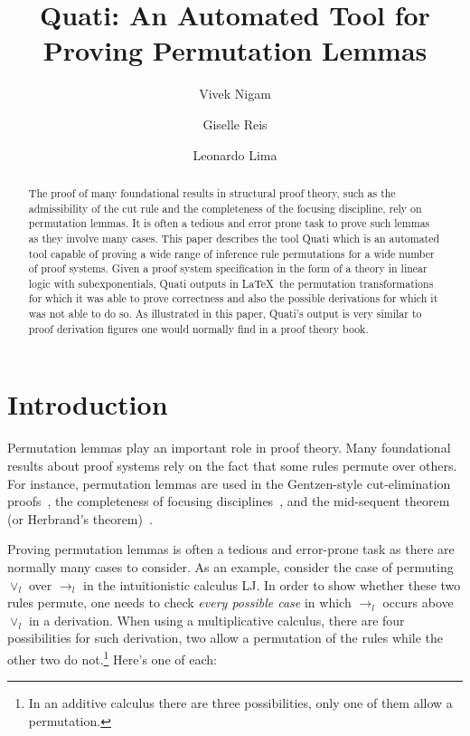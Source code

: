 \documentclass{llncs}
\title{Quati: An Automated Tool for Proving Permutation Lemmas}
\author{Vivek Nigam\inst{1} \and Giselle Reis\inst{2} \and Leonardo Lima\inst{1}}
\institute{Universidade Federal da Para\'{i}ba, Brazil
\and Technische Universit\"{a}t Wien, Austria
}
\begin{document}
\maketitle

\begin{abstract}
The proof of many foundational results in structural proof theory, such as the
admissibility of the cut rule and the completeness of the focusing discipline,
rely on permutation lemmas. It is often a tedious and error prone task to prove
such lemmas as they involve many cases. This paper describes the tool Quati
which is an automated tool capable of proving a wide range of inference rule
permutations for a wide number of proof systems. Given a proof system
specification in the form of a theory in linear logic with subexponentials,
Quati outputs in \LaTeX\ the permutation transformations for which it was able
to prove correctness and also the 
possible derivations for which it was not able to do so. As illustrated in this
paper, Quati's output is very similar to proof derivation figures one would
normally find in a proof theory book. 
\end{abstract}

\vspace{-2mm}
\section{Introduction}

Permutation lemmas play an important role in proof theory. Many foundational
results about proof systems rely on the fact that some rules
permute over others. For instance, permutation lemmas are used in the Gentzen-style 
cut-elimination proofs~\cite{gentzen35}, the completeness of focusing disciplines~\cite{andreoli92jlc,miller07cslb,miller91apal}, 
and the mid-sequent theorem (or Herbrand's theorem)~\cite{herbrand30phd}.

Proving permutation lemmas is often a tedious and error-prone task as there are normally many 
cases to consider. As an example, consider the case of permuting $\vee_l$ over $\rightarrow_l$ in
the intuitionistic calculus LJ. In order to show whether these two
rules permute, one needs to check \emph{every possible case} in which
$\rightarrow_l$ occurs above $\vee_l$ in a derivation. When using a
multiplicative calculus, there are four possibilities for such derivation, two
allow a permutation of the rules while the other two do not.\footnote{In an
additive calculus there are three possibilities, only one of them allow a
permutation.} Here's one of each:
\vspace{-4mm}
\end{document}
